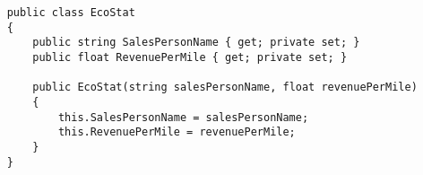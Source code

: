 \begin{verbatim}
    public class EcoStat
    {
        public string SalesPersonName { get; private set; }
        public float RevenuePerMile { get; private set; }
    
        public EcoStat(string salesPersonName, float revenuePerMile)
        {
            this.SalesPersonName = salesPersonName;
            this.RevenuePerMile = revenuePerMile;
        }
    }
\end{verbatim}